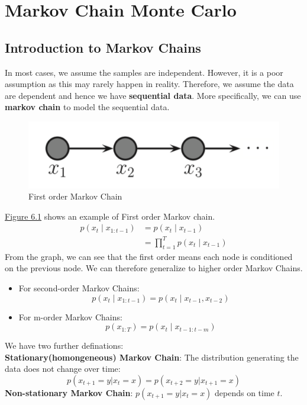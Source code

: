 \section{Markov Chain Monte Carlo}
\subsection{Introduction to Markov Chains}
In most cases, we assume the samples are independent. However, it is a poor assumption as this may rarely happen in reality. Therefore, we assume the data are dependent and hence we have \textbf{sequential data}. More specifically, we can use \textbf{markov chain} to model the sequential data.
\begin{figure}[H]
    \centering
    \includegraphics[width = .6\linewidth]{figures/section6/figure_6_1.png}
    \caption{First order Markov Chain}
    \label{fig:f_mc}
\end{figure}
\hyperref[fig:f_mc]{Figure 6.1} shows an example of First order Markov chain.
\begin{align*} 
    p\left(x_t \mid x_{1: t-1}\right)&=p\left(x_t \mid x_{t-1}\right)\\
    &=\prod_{t=1}^T p\left(x_t \mid x_{t-1}\right)
\end{align*}
From the graph, we can see that the first order means each node is conditioned on the previous node. We can therefore generalize to higher order Markov Chains.
\begin{itemize}    \item For second-order Markov Chains:
    $$p\left(x_t \mid x_{1: t-1}\right)=p\left(x_t \mid x_{t-1},x_{t-2}\right)$$
    \item For m-order Markov Chains:
    $$p\left(x_{1: T}\right)=p\left(x_t \mid x_{t-1:t-m}\right)$$
\end{itemize}
We have two further definations:\\
\textbf{Stationary(homongeneous) Markov Chain}: The distribution generating the data does not change over time:
$$p(x_{t+1}=y|x_t=x)=p(x_{t+2}=y|x_{t+1}=x)$$ 
\textbf{Non-stationary Markov Chain}: $p(x_{t+1}=y|x_t=x)$ depends on time $t$.

